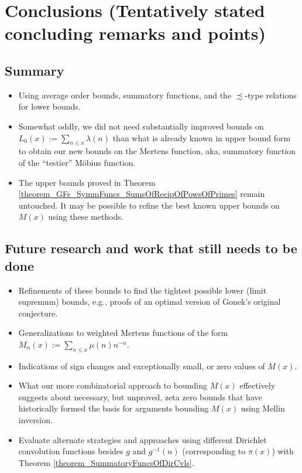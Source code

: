 \documentclass[11pt,reqno,a4letter]{article}
\numberwithin{figure}{section}
\numberwithin{table}{section}
\theoremstyle{plain}
\numberwithin{theorem}{section}
\theoremstyle{definition}
\begin{document}
\newpage 
\section{Conclusions (Tentatively stated concluding remarks and points)} 

\subsection{Summary} 

\begin{itemize} 

\item Using average order bounds, summatory functions, and the $\precsim$-type relations for lower bounds. 
\item Somewhat oddly, we did not need substantially improved bounds on $L_0(x) := \sum_{n \leq x} \lambda(n)$ 
      than what is already known in upper bound form to obtain 
      our new bounds on the Mertens function, aka, summatory function of the ``testier'' M\"obius function. 
\item The upper bounds proved in Theorem \ref{theorem_GFs_SymmFuncs_SumsOfRecipOfPowsOfPrimes} remain untouched. 
      It may be possible to refine the best known upper bounds on $M(x)$ using these methods. 

\end{itemize} 

\subsection{Future research and work that still needs to be done} 

\begin{itemize} 

\item Refinements of these bounds to find the tightest possible lower (limit supremum) bounds, e.g., proofs of an 
      optimal version of Gonek's original conjecture. 
\item Generalizations to weighted Mertens functions of the form $M_{\alpha}(x) := \sum_{n \leq x} \mu(n) n^{-\alpha}$. 
\item Indications of sign changes and exceptionally small, or zero values of $M(x)$. 
\item What our more combinatorial approach to bounding $M(x)$ effectively suggests about necessary, but unproved, 
      zeta zero bounds that have historically formed the basis for arguments bounding $M(x)$ using Mellin inversion. 
\item Evaluate alternate strategies and approaches using different Dirichlet convolution functions 
      besides $g$ and $g^{-1}(n)$ (corresponding to $\pi(x)$) 
      with Theorem \ref{theorem_SummatoryFuncsOfDirCvls}. 

\end{itemize} 
\end{document}
